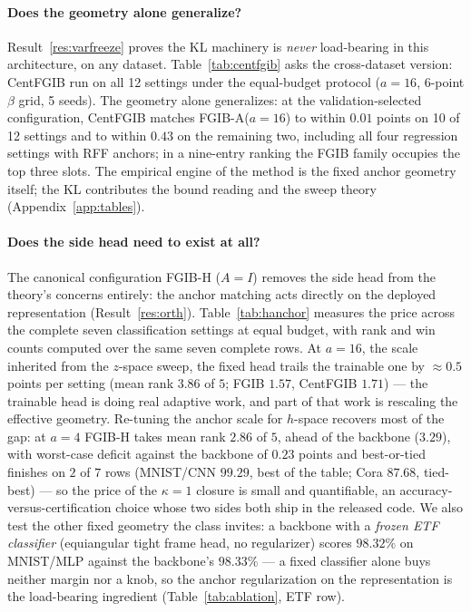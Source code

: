 \documentclass{article} %
\begin{document}
\paragraph{Does the geometry alone generalize?}
Result~\ref{res:varfreeze} proves the KL machinery is \emph{never} load-bearing in this
architecture, on any dataset. Table~\ref{tab:centfgib} asks the cross-dataset version:
CentFGIB run on all 12 settings under the
equal-budget protocol ($a=16$, 6-point $\beta$ grid, 5 seeds). The
geometry alone generalizes: at the validation-selected configuration, CentFGIB matches
FGIB-A($a{=}16$) to within $0.01$ points on 10 of 12 settings and to within $0.43$ on
the remaining two, including all four regression settings with RFF anchors; in a
nine-entry ranking the FGIB family occupies the top three slots. The empirical engine
of the method is the fixed anchor geometry
itself; the KL contributes the bound reading and the sweep theory
(Appendix~\ref{app:tables}).

\paragraph{Does the side head need to exist at all?}
The canonical configuration FGIB-H ($A{=}I$) removes the side head from the theory's
concerns entirely: the anchor matching acts directly on the deployed representation
(Result~\ref{res:orth}). Table~\ref{tab:hanchor} measures the price across the complete
seven classification settings at equal budget, with rank and win counts computed over
the same seven complete rows. At $a=16$, the scale inherited from the $z$-space sweep,
the fixed head trails the trainable one by $\approx 0.5$ points per setting (mean rank
$3.86$ of $5$; FGIB $1.57$, CentFGIB $1.71$) --- the trainable head is doing real
adaptive work, and part of that work is rescaling the effective geometry. Re-tuning the
anchor scale for $h$-space recovers most of the gap: at $a=4$ FGIB-H takes mean rank
$2.86$ of $5$, ahead of the backbone ($3.29$), with worst-case deficit against the
backbone of $0.23$ points and best-or-tied finishes on $2$ of $7$ rows (MNIST/CNN
$99.29$, best of the table; Cora $87.68$, tied-best) --- so the price of the $\kappa=1$
closure is small and quantifiable, an accuracy-versus-certification choice whose two
sides both ship in the released code. We also test the other fixed geometry the class
invites: a backbone with a \emph{frozen ETF classifier} (equiangular tight frame head,
no regularizer) scores $98.32\%$ on MNIST/MLP against the backbone's $98.33\%$ --- a
fixed classifier alone buys neither margin nor a knob, so the anchor regularization on
the representation is the load-bearing ingredient (Table~\ref{tab:ablation}, ETF row).
\end{document}
